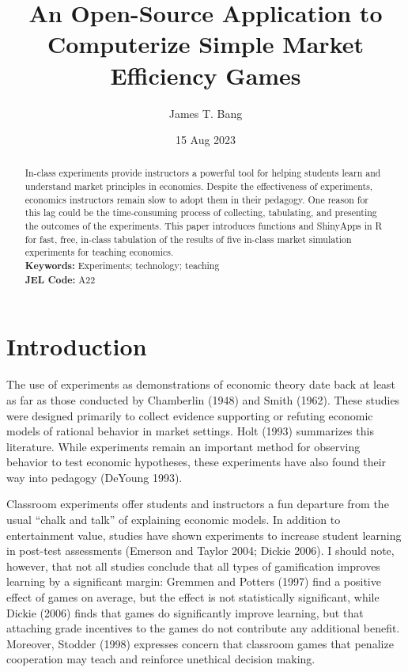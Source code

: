 \documentclass[
]{article}
\title{An Open-Source Application to Computerize Simple Market
Efficiency Games}
\author{James T. Bang}
\date{15 Aug 2023}
\begin{document}
\maketitle
\begin{abstract}
In-class experiments provide instructors a powerful tool for helping
students learn and understand market principles in economics. Despite
the effectiveness of experiments, economics instructors remain slow to
adopt them in their pedagogy. One reason for this lag could be the
time-consuming process of collecting, tabulating, and presenting the
outcomes of the experiments. This paper introduces functions and
ShinyApps in R for fast, free, in-class tabulation of the results of
five in-class market simulation experiments for teaching economics.\\
\textbf{Keywords:} Experiments; technology; teaching\\
\textbf{JEL Code:} A22
\end{abstract}

\newpage
{}
\setcounter{page}{1}

\hypertarget{introduction}{%
\section{Introduction}\label{introduction}}

The use of experiments as demonstrations of economic theory date back at
least as far as those conducted by Chamberlin (1948) and Smith (1962).
These studies were designed primarily to collect evidence supporting or
refuting economic models of rational behavior in market settings. Holt
(1993) summarizes this literature. While experiments remain an important
method for observing behavior to test economic hypotheses, these
experiments have also found their way into pedagogy (DeYoung 1993).

Classroom experiments offer students and instructors a fun departure
from the usual ``chalk and talk'' of explaining economic models. In
addition to entertainment value, studies have shown experiments to
increase student learning in post-test assessments (Emerson and Taylor
2004; Dickie 2006). I should note, however, that not all studies
conclude that all types of gamification improves learning by a
significant margin: Gremmen and Potters (1997) find a positive effect of
games on average, but the effect is not statistically significant, while
Dickie (2006) finds that games do significantly improve learning, but
that attaching grade incentives to the games do not contribute any
additional benefit. Moreover, Stodder (1998) expresses concern that
classroom games that penalize cooperation may teach and reinforce
unethical decision making.
\end{document}
